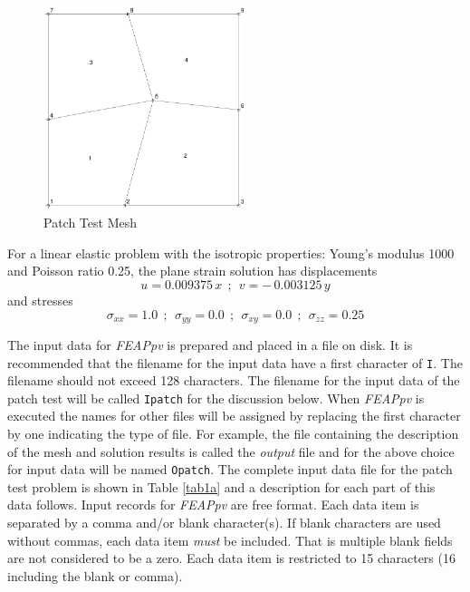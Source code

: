 \begin{figure}[ht!]
\centerline {\hfil \includegraphics[width=2.3in]{figs/patch4} \hfil}
\caption{Patch Test Mesh}
\label{fig1}
\end{figure}
For  a linear elastic problem with the isotropic properties: Young's modulus
1000 and Poisson ratio 0.25, the plane strain solution has
displacements
$$ u = 0.009375 \, x  ~~;~~ v = - \, 0.003125 \, y$$
and stresses
$$ \sigma_{xx} = 1.0  ~~;~~ \sigma_{yy} = 0.0 ~~;~~ \sigma_{xy} = 0.0 ~~;~~
\sigma_{zz} = 0.25$$

The input data for {\sl FEAPpv} is prepared and placed in a file on disk.
It is recommended that the filename for the input data have a first
character of {\tt I}.  The filename should not exceed 128 characters.
The filename for the input data of the patch test will be
called {\tt Ipatch} for the discussion below.
When {\sl FEAPpv} is executed the names for other files will be assigned by 
replacing the first character by one indicating the type of file.  For
example, the file containing the description of the mesh and solution
results is called the {\it output} file and for the above choice
for input data will be named {\tt Opatch}.
The complete input data file for the patch test
problem is shown in Table \ref{tab1a} and a 
description for each part of this data follows.
Input records for {\sl FEAPpv} are free format.  Each data item
is separated by a comma and/or blank character(s).
If blank characters are used without commas, each data item {\it must} be
included.  That is multiple blank fields are not considered to be a zero.
Each data item is restricted to 15 characters (16 including the blank or
comma).

